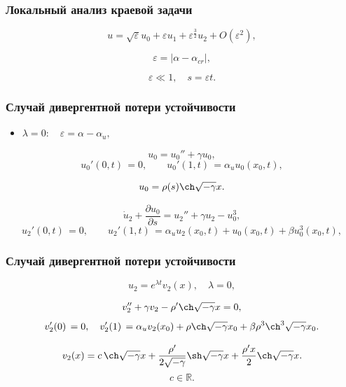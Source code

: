 \documentclass[fullscreen=true, unicode, bookmarks=false]{beamer}
\begin{document}
\begin{frame}
\frametitle{ Локальный анализ краевой задачи }

\begin{equation}
	u = \sqrt{\varepsilon}u_0 + \varepsilon u_1 + \varepsilon^{\frac{3}{2}} u_2 + O(\varepsilon^2),
\end{equation}

\bigskip

$$ \varepsilon = | \alpha - \alpha_{cr} |, $$

$$ \varepsilon \ll 1, \quad s = \varepsilon t. $$

\end{frame}

\begin{frame}
\frametitle{ Случай дивергентной потери устойчивости }

\begin{itemize}
\item { $ \lambda = 0: \quad \varepsilon=\alpha-\alpha_u, $
}
\end{itemize}

\medskip

\begin{equation}
	u_0 = u_0'' + \gamma u_0,
\end{equation}
\begin{equation}
	u_0'(0, t) \, = 0, \qquad u_0'(1, t) \, = \alpha_u u_0(x_0, t),
\end{equation}

$$ u_0 = \rho(s) \ch \sqrt{-\gamma} x. $$

\medskip

\begin{equation}
	\dot u_2 + \frac{\partial u_0}{\partial s} = u_2'' + \gamma u_2 - u_0^3,
\end{equation}
\begin{equation}
	u_2'(0, t) \, = 0, \qquad u_2'(1, t) \, = \alpha_u u_2(x_0, t) + u_0(x_0, t) + \beta u_0^3(x_0, t),
\end{equation}

\end{frame}

\begin{frame}
\frametitle{ Случай дивергентной потери устойчивости }

$$ u_2 = e^{\lambda t}v_2(x), \quad \lambda = 0, $$

\medskip

\begin{equation}
	v_2'' + \gamma v_2 - \rho' \ch \sqrt{-\gamma} x = 0,
\end{equation}
\begin{equation}
	v_2'(0) \, = 0, \quad v_2'(1) \, = \alpha_u v_2(x_0) + \rho \ch \sqrt{-\gamma} x_0 + \beta \rho^3\ch^3 \sqrt{-\gamma} x_0.
\end{equation}

\medskip

$$ v_2(x) = c\,\ch \sqrt{-\gamma} x + \frac{\rho'}{2\sqrt{-\gamma}}\sh\sqrt{-\gamma}x + \frac{\rho'x}{2} \ch\sqrt{-\gamma}x. $$
$$ c \in \mathbb{R}. $$

\end{frame}
\end{document}
